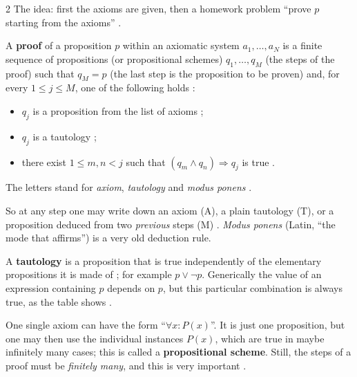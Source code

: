 \begin{paracol}{2}
The idea: first the axioms are given, then a homework problem ``prove $p$ starting from the axioms''
.

\begin{definition}\label{def:lo-proof}
A \textbf{proof} of a proposition $p$ within an axiomatic system $a_1,\dots,a_N$ is a finite sequence of
propositions (or propositional schemes) $q_1,\dots,q_M$ (the steps of the proof)  such that
$q_M=p$ (the last step is the proposition to be proven)  and, for every $1\le j\le M$, one of the
following holds :
\begin{itemize}
  \item[(A)] $q_j$ is a proposition from the list of axioms ;
  \item[(T)] $q_j$ is a tautology ;
  \item[(M)] there exist $1\le m,n<j$ such that $(q_m\wedge q_n)\Rightarrow q_j$ is true .
\end{itemize}
The letters stand for \emph{axiom}, \emph{tautology} and \emph{modus ponens} .
\end{definition}
So at any step one may write down an axiom (A), a plain tautology (T), or a proposition deduced from two
\emph{previous} steps (M) . \emph{Modus ponens} (Latin, ``the mode that affirms'') is a very old
deduction rule.

\begin{definition}\label{def:lo-tautology}
A \textbf{tautology} is a proposition that is true independently of the elementary propositions it is made of
; for example $p\vee\neg p$. Generically the value of an expression containing $p$ depends on $p$,
but this particular combination is always true, as the table shows .
\end{definition}

\begin{remark}
One single axiom can have the form ``$\forall x\colon P(x)$''. It is just one proposition, but one may then use
the individual instances $P(x)$, which are true in maybe infinitely many cases; this is called a
\textbf{propositional scheme}. Still, the steps of a proof must be \emph{finitely many}, and this is very
important .
\end{remark}


\end{paracol}
